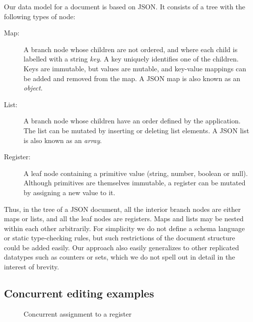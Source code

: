 \documentclass[a4paper,twocolumn,10pt]{article}
\begin{document}
Our data model for a document is based on JSON. It consists of a tree with the following types of node:

\begin{description}
\item[Map:] A branch node whose children are not ordered, and where each child is labelled with a string \emph{key}. A key uniquely identifies one of the children. Keys are immutable, but values are mutable, and key-value mappings can be added and removed from the map. A JSON map is also known as an \emph{object}.
\item[List:] A branch node whose children have an order defined by the application. The list can be mutated by inserting or deleting list elements. A JSON list is also known as an \emph{array}.
\item[Register:] A leaf node containing a primitive value (string, number, boolean or null). Although primitives are themselves immutable, a register can be mutated by assigning a new value to it.
\end{description}

Thus, in the tree of a JSON document, all the interior branch nodes are either maps or lists, and all the leaf nodes are registers. Maps and lists may be nested within each other arbitrarily. For simplicity we do not define a schema language or static type-checking rules, but such restrictions of the document structure could be added easily. Our approach also easily generalizes to other replicated datatypes such as counters or sets, which we do not spell out in detail in the interest of brevity.

\subsection{Concurrent editing examples}

\begin{figure}
\centering
{}
\caption{Concurrent assignment to a register}\label{fig:register-assign}
\end{figure}
\end{document}
